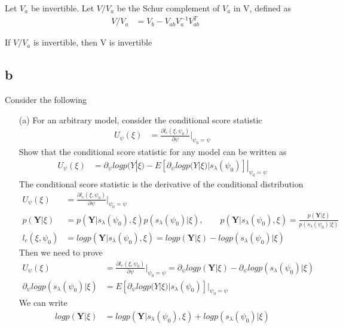 \documentclass[11pt]{article} %
\begin{document}
Let $V_a$ be invertible. Let $V/V_a$ be the Schur complement of $V_a$ in V, defined as
\begin{align*}
	V/V_a &= V_b - V_{ab} V_{a}^{-1} V_{ab}^T
\end{align*}

If $V/V_a$ is invertible, then V is invertible 




\subsection{b}Consider the following
\begin{itemize}
	\item[(a)] For an arbitrary model, consider the conditional score statistic
	\begin{align*}
		U_{\psi}(\xi) &= \frac{\partial l_c(\xi, \psi_0)}{\partial \psi} |_{\psi_0=\psi}
	\end{align*} 
	Show that the conditional score statistic for any model can be written as
	\begin{align*}
		U_{\psi}(\xi) &= \partial_{\psi} log p(Y|\xi)- E[\partial_{\psi} log p(Y|\xi)|s_{\lambda}(\psi_0)]|_{\psi_0=\psi}
	\end{align*} 
	The conditional score statistic is the derivative of the conditional distribution
	\begin{align*}
		U_{\psi}(\xi) &= \frac{\partial l_c(\xi, \psi_0)}{\partial \psi} |_{\psi_0=\psi}\\
		p(\textbf{Y}| \xi) &= p(\textbf{Y}|s_{\lambda}(\psi_0), \xi) p(s_{\lambda}(\psi_0) | \xi), \qquad p(\textbf{Y}|s_{\lambda}(\psi_0), \xi) = \frac{p(\textbf{Y}| \xi)}{p(s_{\lambda}(\psi_0) | \xi)} \\
		l_c(\xi, \psi_0) &= log p(\textbf{Y}|s_{\lambda}(\psi_0), \xi)= log p(\textbf{Y}| \xi) - log p(s_{\lambda}(\psi_0) | \xi)
	\end{align*}
	Then we need to prove 
	\begin{align*}
		U_{\psi}(\xi) &= \frac{\partial l_c(\xi, \psi_0)}{\partial \psi} |_{\psi_0=\psi} = \partial_{\psi} log p(\textbf{Y}| \xi) - \partial_{\psi} log p(s_{\lambda}(\psi_0) | \xi)\\
		\partial_{\psi} log p(s_{\lambda}(\psi_0) | \xi) &= E[\partial_{\psi} log p(Y|\xi)|s_{\lambda}(\psi_0)]|_{\psi_0=\psi}
	\end{align*}
	We can write
	\begin{align*}
		log p(\textbf{Y}| \xi) &= log  p(\textbf{Y}|s_{\lambda}(\psi_0), \xi) + log p(s_{\lambda}(\psi_0) | \xi)\\

\end{align*}
\end{itemize}
\end{document}
